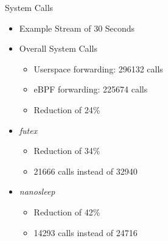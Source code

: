 \documentclass[shortpres,aspectratio=43]{beamer}
\newlength{\mylength}
\begin{document}
\begin{frame}{System Calls}
    \begin{minipage}{0.43\textwidth}
        \begin{itemize}
            \item Example Stream of 30 Seconds
            \vspace{2\mylength}
            \item Overall System Calls 
            \vspace{2\mylength}
            \begin{itemize}
                \item Userspace forwarding: 296132 calls
                \vspace{2\mylength}
                \item eBPF forwarding: 225674 calls
                \vspace{2\mylength}
                \item Reduction of 24\%
            \end{itemize}
        \end{itemize}
    \end{minipage}\hfill
    \begin{minipage}{0.51\textwidth}
        \begin{itemize}
            \item \textit{futex}
            \vspace{2\mylength}
            \begin{itemize}
                \item Reduction of 34\%
                \vspace{2\mylength}
                \item 21666 calls instead of 32940
            \end{itemize}
            \vspace{2\mylength}
            \item \textit{nanosleep}
            \vspace{2\mylength}
            \begin{itemize}
                \item Reduction of 42\%
                \vspace{2\mylength}
                \item 14293 calls instead of 24716
            \end{itemize}
            \vspace{2\mylength}

\end{itemize}
\end{minipage}
\end{frame}
\end{document}
